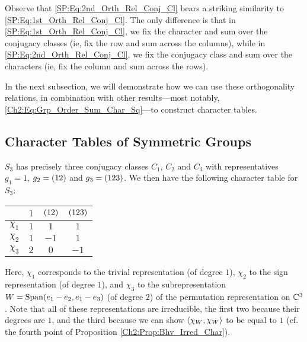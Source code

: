 \begin{remark}
    Observe that \eqref{SP:Eq:2nd_Orth_Rel_Conj_Cl} bears a striking similarity to \eqref{SP:Eq:1st_Orth_Rel_Conj_Cl}. The only difference is that in \eqref{SP:Eq:1st_Orth_Rel_Conj_Cl}, we fix the character and sum over the conjugacy classes (ie, fix the row and sum across the columns), while in \eqref{SP:Eq:2nd_Orth_Rel_Conj_Cl}, we fix the conjugacy class and sum over the characters (ie, fix the column and sum across the rows).
\end{remark}

In the next subsection, we will demonstrate how we can use these orthogonality relations, in combination with other results---most notably, \eqref{Ch2:Eq:Grp_Order_Sum_Char_Sq}---to construct character tables.

\subsection{Character Tables of Symmetric Groups}

\begin{boxexample}[$S_3$]
    $S_3$ has precisely three conjugacy classes $C_1$, $C_2$ and $C_3$ with representatives $g_1 = 1$, $g_2 = \left( 1 2 \right)$ and $g_3 = \left( 1 2 3 \right)$. We then have the following character table for $S_3$:
    \begin{table}[H]
        \centering
        \begin{tabular}{c|ccc}
            & $1$ & $\left( 12 \right)$ & $\left( 123 \right)$ \\
            \hline
            $\chi_1$ & $1$ & $1$ & $1$ \\
            $\chi_2$ & $1$ & $-1$ & $1$ \\
            $\chi_3$ & $2$ & $0$ & $-1$
        \end{tabular}
    \end{table}
    Here, $\chi_1$ corresponds to the trivial representation (of degree $1$), $\chi_2$ to the sign representation (of degree $1$), and $\chi_3$ to the subrepresentation $W = \operatorname{Span}\!\left( e_1 - e_2, e_1 - e_3 \right)$ (of degree $2$) of the permutation representation on $\mathbb{C}^3$. Note that all of these representations are irreducible, the first two because their degrees are $1$, and the third because we can show $\left\langle \chi_W, \chi_W \right\rangle$ to be equal to $1$ (cf. the fourth point of Proposition \ref{Ch2:Prop:Bhv_Irred_Char}).
\end{boxexample}


